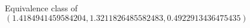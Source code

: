 \documentclass[preview]{standalone}
\begin{document}
\begin{center}
Equivalence class of $(1.4184941459584204, 1.3211826485582483, 0.4922913436475435)$
\end{center}
\end{document}
